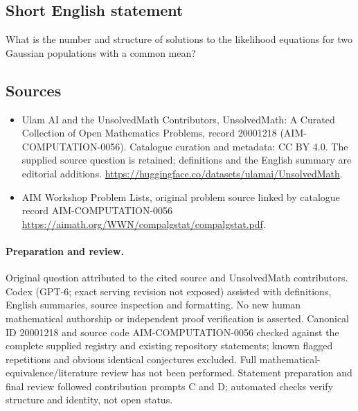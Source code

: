 \documentclass[11pt]{article}
\begin{document}
\subsection{Short English statement}
What is the number and structure of solutions to the likelihood equations for two Gaussian populations with a common mean?
\subsection{Sources}
\begin{itemize}
\item[\hypertarget{source:20001218:1}{S1}] Ulam AI and the UnsolvedMath Contributors, UnsolvedMath: A Curated Collection of Open Mathematics Problems, record 20001218 (AIM-COMPUTATION-0056). Catalogue curation and metadata: CC BY 4.0. The supplied source question is retained; definitions and the English summary are editorial additions.
\url{https://huggingface.co/datasets/ulamai/UnsolvedMath}.
\item[\hypertarget{source:20001218:2}{S2}] AIM Workshop Problem Lists, original problem source linked by catalogue record AIM-COMPUTATION-0056
\url{https://aimath.org/WWN/compalgstat/compalgstat.pdf}.
\end{itemize}
\paragraph{Preparation and review.}
Original question attributed to the cited source and UnsolvedMath contributors. Codex (GPT-6; exact serving revision not exposed) assisted with definitions, English summaries, source inspection and formatting. No new human mathematical authorship or independent proof verification is asserted. Canonical ID 20001218 and source code AIM-COMPUTATION-0056 checked against the complete supplied registry and existing repository statements; known flagged repetitions and obvious identical conjectures excluded. Full mathematical-equivalence/literature review has not been performed. Statement preparation and final review followed contribution prompts C and D; automated checks verify structure and identity, not open status.
\label{end:20001218}
\end{document}
